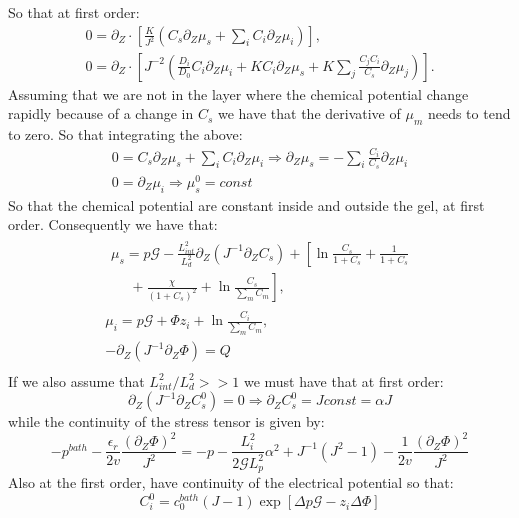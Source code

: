 So that at first order:
\begin{gather}
0=\partial_Z \cdot\left[\frac{K}{J^2} \left(C_s\partial_Z \mu_s +\sum_i  C_i \partial_Z \mu_i\right)\right],\\
0= \partial_Z \cdot\left[ J^{-2} \left(\frac{D_i}{D_0}C_i\partial_Z \mu_i + K C_i \partial_Z\mu_s + K \sum_j \frac{C_jC_i}{C_s}\partial_Z\mu_j\right)\right].
\end{gather}
Assuming that we are not in the layer where the chemical potential change rapidly because of a change in $C_s$ we have that the derivative of $\mu_m$ needs to tend to zero. So that integrating the above:
\begin{gather}
0=C_s\partial_Z \mu_s +\sum_i  C_i \partial_Z \mu_i \Rightarrow \partial_Z \mu_s=-\sum_i  \frac{C_i}{C_s} \partial_Z \mu_i \\
0=\partial_Z \mu_i \Rightarrow \mu^0_s=const
\end{gather}
So that the chemical potential are constant inside and outside the gel, at first order. Consequently we have that:
\begin{gather}
\begin{aligned}
\mu_s = p \mathcal{G} - \frac{L^2_{int}}{L_d^2}  \partial_Z (J^{-1} \partial_Z C_s) + \left[\ln \frac{C_s}{1+C_s} + \frac{1}{1+C_s}\right.\\
\left.\ \ \ \ \ \ +\frac{\chi}{(1+C_s)^2} + \ln \frac{C_s}{\sum_m C_m} \right], 
\end{aligned}\\[2.5mm]
\mu_i = p \mathcal{G}+ \Phi z_i + \ln \frac{C_i}{\sum_m C_m} ,\\
- \partial_Z (J^{-1}\partial_Z\Phi) = Q\, \\[2.5mm]
\end{gather}
If we also assume that $L_{int}^2/L^2_d>>1$ we must have that at first order:
\begin{equation}
\partial_Z(J^{-1}\partial_ZC^0_s)=0 \Rightarrow \partial_Z C^0_s = J const = \alpha J 
\end{equation}
while the continuity of the stress tensor is given by:
\begin{equation}
-p^{bath}-\frac{\epsilon_r}{2v}\frac{(\partial_Z \Phi)^2}{J^2}=-p - \frac{L^2_i}{2\mathcal{G}L_p^2} \alpha^2 + J^{-1}\left(J^2-1\right)-\frac{1}{2v}\frac{(\partial_Z \Phi)^2}{J^2}
\end{equation}
Also at the first order, have continuity of the electrical potential so that:
\begin{equation}
C^0_i = c^{bath}_0(J-1) \exp\left[\Delta p\mathcal{G}-z_i\Delta \Phi\right]
\end{equation}
